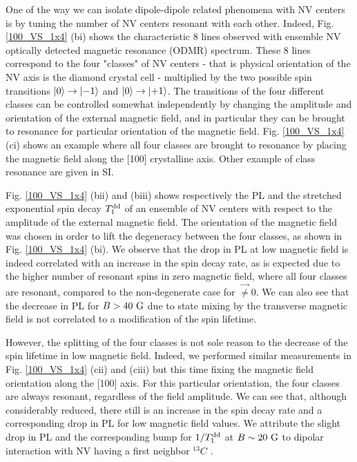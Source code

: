 \documentclass[preprintnumbers,amsmath,amssymb,superscriptaddress,twocolumn,showpacs]{revtex4-2}
\begin{document}
One of the way we can isolate dipole-dipole related phenomena with NV centers is by tuning the number of NV centers resonant with each other. Indeed, Fig. \ref{100_VS_1x4} (bi) shows the characteristic 8 lines observed with ensemble NV optically detected magnetic resonance (ODMR) spectrum. These 8 lines correspond to the four "classes" of NV centers - that is physical orientation of the NV axis is the diamond crystal cell - multiplied by the two possible spin transitions $\ket{0}\to\ket{-1}$ and $\ket{0}\to\ket{+1}$. The transitions of the four different classes can be controlled somewhat independently by changing the amplitude and orientation of the external magnetic field, and in particular they can be brought to resonance for particular orientation of the magnetic field. Fig. \ref{100_VS_1x4} (ci) shows an example where all four classes are brought to resonance by placing the magnetic field along the [100] crystalline axis. Other example of class resonance are given in SI.

Fig. \ref{100_VS_1x4} (bii) and (biii) shows respectively the PL and the stretched exponential spin decay $T_1^{\rm dd}$ of an ensemble of NV centers with respect to the amplitude of the external magnetic field. The orientation of the magnetic field was chosen in order to lift the degeneracy between the four classes, as shown in Fig. \ref{100_VS_1x4} (bi). We observe that the drop in PL at low magnetic field is indeed correlated with an increase in the spin decay rate, as is expected due to the higher number of resonant spins in zero magnetic field, where all four classes are resonant, compared to the non-degenerate case for $\vec \neq 0$. We can also see that the decrease in PL for $B>40\ \rm G$ due to state mixing by the transverse magnetic field is not correlated to a modification of the spin lifetime.

However, the splitting of the four classes is not sole reason to the decrease of the spin lifetime in low magnetic field. Indeed, we performed similar measurements in Fig. \ref{100_VS_1x4} (cii) and (ciii) but this time fixing the magnetic field orientation along the [100] axis. For this particular orientation, the four classes are always resonant, regardless of the field amplitude. We can see that, although considerably reduced, there still is an increase in the spin decay rate and a corresponding drop in PL for low magnetic field values. We attribute the slight drop in PL and the corresponding bump for $1/T_1^{\rm dd}$ at $B \sim 20\ \rm G$ to dipolar interaction with NV having a first neighbor $^{13}C$ \cite{pellet2021optical}.
\end{document}

